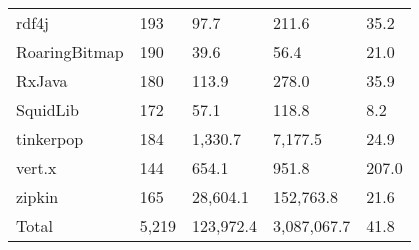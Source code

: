\begin{tabular}{lllll}
              rdf4j &   193 &        97.7 &        211.6 &   35.2 \\
      RoaringBitmap &   190 &        39.6 &         56.4 &   21.0 \\
             RxJava &   180 &       113.9 &        278.0 &   35.9 \\
           SquidLib &   172 &        57.1 &        118.8 &    8.2 \\
          tinkerpop &   184 &     1,330.7 &      7,177.5 &   24.9 \\
             vert.x &   144 &       654.1 &        951.8 &  207.0 \\
             zipkin &   165 &    28,604.1 &    152,763.8 &   21.6 \\
              Total & 5,219 &   123,972.4 &  3,087,067.7 &   41.8 \\
\bottomrule
\end{tabular}
